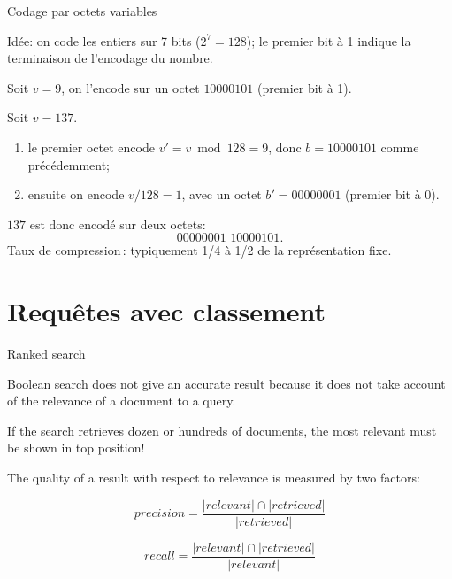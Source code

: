 \begin{frame}{Codage par octets variables}

Idée: on code les entiers sur 7 bits ($2^7= 128$); le premier bit à 1 indique la terminaison de l'encodage du nombre.

\vfill

Soit  $v=9$, on l'encode sur un octet $10000101$ (premier bit à 1). 

\vfill
Soit $v=137$. 
\begin{enumerate}
  \item le premier octet encode $v'= v \bmod 128 = 9$, donc $b=10000101$ comme précédemment;
  \item ensuite on encode $ v / 128 = 1 $, avec un octet $b' = 00000001$ (premier bit à 0).
\end{enumerate}

$137$ est donc encodé sur deux octets:
\[00000001\,\,10000101.\]
\vfill
Taux de compression\,: typiquement 1/4 à 1/2 de la représentation fixe.
\end{frame}




\section{Requêtes avec classement}

\begin{frame}{Ranked search}

Boolean search does not give an accurate result because it does not take account
of the \alert{relevance} of a document to a query.

\vfill

If the search retrieves dozen or hundreds of documents, the most relevant must
be shown in top position!

\vfill

The quality of a result with respect to relevance is measured by two factors:

$$precision =\frac{|relevant| \cap |retrieved|}{|retrieved|}$$

$$recall =\frac{|relevant| \cap |retrieved|}{|relevant|}$$

\end{frame}


